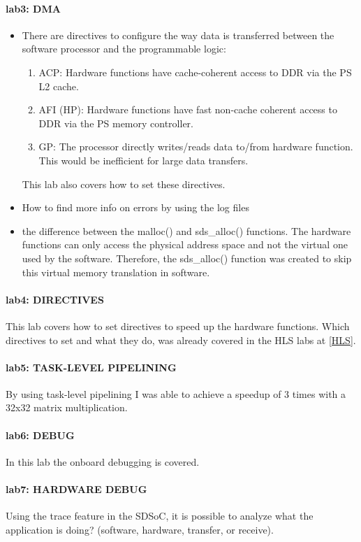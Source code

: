 \paragraph{lab3: DMA}
\begin{itemize}
	\item There are directives to configure the way data is transferred between the software processor and the programmable logic:
	\begin{enumerate}
		\item ACP: Hardware functions have cache-coherent access to DDR via the PS L2 cache.
		\item AFI (HP):    Hardware functions have fast non-cache coherent access to DDR via the PS memory controller.
		\item GP: The processor directly writes/reads data to/from hardware function. This would be inefficient for large data transfers.
	\end{enumerate}
	This lab also covers how to set these directives.
	
	\item How to find more info on errors by using the log files
	
	\item the difference between the malloc() and sds\_alloc() functions. The hardware functions can only access the physical address space and not the virtual one used by the software. Therefore, the sds\_alloc() function was created to skip this virtual memory translation in software.
\end{itemize}

\paragraph{lab4: DIRECTIVES} This lab covers how to set directives to speed up the hardware functions. Which directives to set and what they do, was already covered in the HLS labs at \ref{HLS}.

\paragraph{lab5: TASK-LEVEL PIPELINING} By using task-level pipelining I was able to achieve a speedup of 3 times with a 32x32 matrix multiplication.

\paragraph{lab6: DEBUG} In this lab the onboard debugging is covered.

\paragraph{lab7: HARDWARE DEBUG} 
Using the trace feature in the SDSoC, it is possible to analyze what the application is doing? (software, hardware, transfer, or receive).
